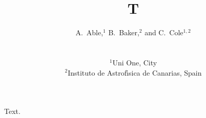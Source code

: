 \documentclass{mnras}
\title{T}
\author[A. Able et al.]
{\parbox{\textwidth}{\raggedright A.~Able,$^{1}$
B.~Baker,$^{2}$ and C.~Cole$^{1,2}$}\vspace{0.4cm}\\
\parbox{\textwidth}{\raggedright $^{1}$Uni One, City\\
$^{2}$Instituto de Astrof{\'\i}sica de Canarias, Spain}}
\begin{document}
\maketitle
Text.
\end{document}

